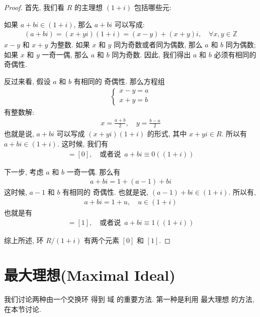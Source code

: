 \documentclass[utf8]{ctexbook}
\begin{document}
\begin{proof}
首先, 我们看 $R$ 的主理想 $(1+i)$ 包括哪些元:

如果 $a+bi \in (1+i)$, 那么 $a+bi$ 可以写成: 
\begin{align*}
(a+bi) = (x + yi)(1+i) = (x-y) + (x+y)i , \quad \forall x, y \in \mathbb{Z}
\end{align*}
$x-y$ 和 $x+y$ 为整数. 如果 $x$ 和 $y$ 同为奇数或者同为偶数, 那么 $a$ 和 $b$ 同为偶数; 如果 $x$ 和 $y$ 一奇一偶, 那么  $a$ 和 $b$ 同为奇数. 因此, 我们得出 $a$ 和 $b$ 必须有相同的 奇偶性.

反过来看, 假设 $a$ 和 $b$ 有相同的 奇偶性. 那么方程组
\begin{align*}
\left\{ 
\begin{array}{l}
x-y = a \\
x + y = b
\end{array}
\right.
\end{align*}
有整数解:
\begin{align*}
x = \frac{a+b}{2}, \quad y = \frac{b-a}{2}
\end{align*}
也就是说, $a+bi$ 可以写成 $(x + yi)(1+i)$ 的形式, 其中 $x+yi \in R$. 所以有 $a+bi \in (1+i)$. 这时候, 我们有
\begin{align*}
[a+bi] = [0] , \quad \mbox{或者说 } \, a + bi \equiv 0 ( (1+i) )
\end{align*}

下一步, 考虑 $a$ 和 $b$ 一奇一偶. 那么有
\begin{align*}
a + bi = 1 + (a-1) + bi 
\end{align*}
这时候, $a-1$ 和 $b$ 有相同的 奇偶性. 也就是说, $(a-1) + bi \in (1+i) $. 所以有,
\begin{align*}
a + b i = 1 + u, \quad u \in (1+i)
\end{align*}
也就是有
\begin{align*}
[a+bi] = [1] , \quad \mbox{或者说 } \, a + bi \equiv 1 ( (1+i) )
\end{align*}

综上所述, 环 $R/(1+i)$ 有两个元素 $[0]$ 和 $[1]$.

\end{proof}

\section{最大理想(Maximal Ideal)}

我们讨论两种由一个交换环 得到 域 的重要方法. 第一种是利用 最大理想 的方法, 在本节讨论.
\end{document}
